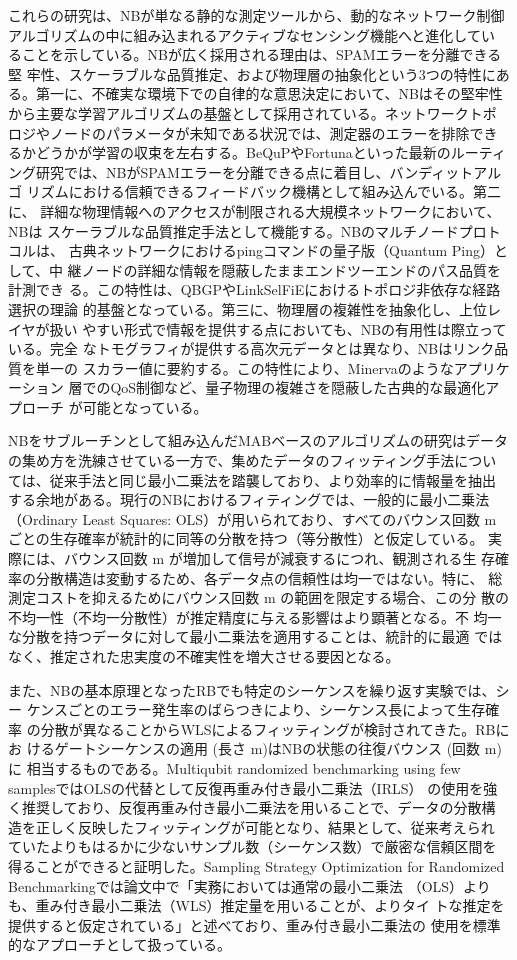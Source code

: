 \documentclass[conference]{IEEEtran}
\begin{document}
これらの研究は、NBが単なる静的な測定ツールから、動的なネットワーク制御
アルゴリズムの中に組み込まれるアクティブなセンシング機能へと進化してい
ることを示している。NBが広く採用される理由は、SPAMエラーを分離できる堅
牢性、スケーラブルな品質推定、および物理層の抽象化という3つの特性にあ
る。第一に、不確実な環境下での自律的な意思決定において、NBはその堅牢性
から主要な学習アルゴリズムの基盤として採用されている。ネットワークトポ
ロジやノードのパラメータが未知である状況では、測定器のエラーを排除でき
るかどうかが学習の収束を左右する。BeQuPやFortunaといった最新のルーティ
ング研究では、NBがSPAMエラーを分離できる点に着目し、バンディットアルゴ
リズムにおける信頼できるフィードバック機構として組み込んでいる。第二に、
詳細な物理情報へのアクセスが制限される大規模ネットワークにおいて、NBは
スケーラブルな品質推定手法として機能する。NBのマルチノードプロトコルは、
古典ネットワークにおけるpingコマンドの量子版（Quantum Ping）として、中
継ノードの詳細な情報を隠蔽したままエンドツーエンドのパス品質を計測でき
る。この特性は、QBGPやLinkSelFiEにおけるトポロジ非依存な経路選択の理論
的基盤となっている。第三に、物理層の複雑性を抽象化し、上位レイヤが扱い
やすい形式で情報を提供する点においても、NBの有用性は際立っている。完全
なトモグラフィが提供する高次元データとは異なり、NBはリンク品質を単一の
スカラー値に要約する。この特性により、Minervaのようなアプリケーション
層でのQoS制御など、量子物理の複雑さを隠蔽した古典的な最適化アプローチ
が可能となっている。



NBをサブルーチンとして組み込んだMABベースのアルゴリズムの研究はデータ
の集め方を洗練させている一方で、集めたデータのフィッティング手法につい
ては、従来手法と同じ最小二乗法を踏襲しており、より効率的に情報量を抽出
する余地がある。現行のNBにおけるフィティングでは、一般的に最小二乗法
（Ordinary Least Squares: OLS）が用いられており、すべてのバウンス回数
m ごとの生存確率が統計的に同等の分散を持つ（等分散性）と仮定している。
実際には、バウンス回数 m が増加して信号が減衰するにつれ、観測される生
存確率の分散構造は変動するため、各データ点の信頼性は均一ではない。特に、
総測定コストを抑えるためにバウンス回数 m の範囲を限定する場合、この分
散の不均一性（不均一分散性）が推定精度に与える影響はより顕著となる。不
均一な分散を持つデータに対して最小二乗法を適用することは、統計的に最適
ではなく、推定された忠実度の不確実性を増大させる要因となる。


また、NBの基本原理となったRBでも特定のシーケンスを繰り返す実験では、シー
ケンスごとのエラー発生率のばらつきにより、シーケンス長によって生存確率
の分散が異なることからWLSによるフィッティングが検討されてきた。RBにお
けるゲートシーケンスの適用 (長さ m)はNBの状態の往復バウンス (回数 m)に
相当するものである。Multiqubit randomized benchmarking using few
samplesではOLSの代替として反復再重み付き最小二乗法（IRLS） の使用を強
く推奨しており、反復再重み付き最小二乗法を用いることで、データの分散構
造を正しく反映したフィッティングが可能となり、結果として、従来考えられ
ていたよりもはるかに少ないサンプル数（シーケンス数）で厳密な信頼区間を
得ることができると証明した。Sampling Strategy Optimization for
Randomized Benchmarkingでは論文中で「実務においては通常の最小二乗法
（OLS）よりも、重み付き最小二乗法（WLS）推定量を用いることが、よりタイ
トな推定を提供すると仮定されている」と述べており、重み付き最小二乗法の
使用を標準的なアプローチとして扱っている。
\end{document}
